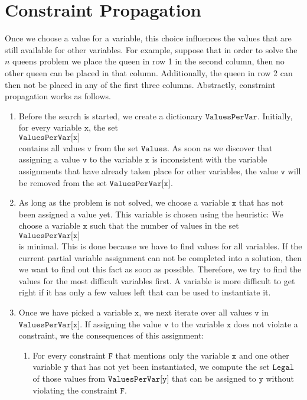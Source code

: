 \section{Constraint Propagation}
Once we choose a value for a variable, this choice influences the values that are still available for other variables.
For example, suppose that in order to solve the $n$ queens problem we place the queen in row 1 in the second
column, then no other queen can be placed in 
that column.   Additionally, the queen in row 2 can then not be placed in any of the first three columns.
Abstractly, constraint propagation works as follows.
\begin{enumerate}
\item Before the search is started, we create a dictionary $\texttt{ValuesPerVar}$.  Initially, for every variable
      $\texttt{x}$,  the set
      \\[0.2cm]
      \hspace*{1.3cm}
      $\texttt{ValuesPerVar[x]}$ 
      \\[0.2cm]
      contains all values $\texttt{v}$ from the set $\texttt{Values}$.  As soon as we discover that assigning a
      value $\texttt{v}$ to the variable $\texttt{x}$ is inconsistent with the variable
      assignments that have already taken place for other variables, the value $\texttt{v}$ will be removed from the set
      $\texttt{ValuesPerVar[x]}$. 
\item As long as the problem is not solved,  we choose a variable $\texttt{x}$ that has not been assigned a
      value yet.  This variable is chosen using the  heuristic:  We choose a
      variable $\texttt{x}$ such that the number of values in the set
      \\[0.2cm]
      \hspace*{1.3cm}
      $\texttt{ValuesPerVar[x]}$ 
      \\[0.2cm]
      is minimal.  This is done because we have to
      find values for all variables.  If the current partial variable assignment can not be completed into a
      solution, then we want to find out this fact as soon as possible.  Therefore, we try to find the values
      for the most difficult variables first.  A variable is more difficult to get right if it has only a few
      values left that can be used to instantiate it.
\item Once we have picked a variable $\texttt{x}$, we next iterate over all values $\texttt{v}$ in
      $\texttt{ValuesPerVar[x]}$.  If assigning the value $\texttt{v}$ to the variable $\texttt{x}$ does not
      violate a constraint, we  the consequences of this assignment:
      \begin{enumerate}
      \item For every constraint $\texttt{F}$ that mentions only the variable $\texttt{x}$ and one other variable
            $\texttt{y}$ that has not yet been instantiated, we compute the set $\texttt{Legal}$ of those values from 
            $\texttt{ValuesPerVar[y]}$ that can be assigned to $\texttt{y}$ without violating the constraint
            $\texttt{F}$.
            

\end{enumerate}
\end{enumerate}
